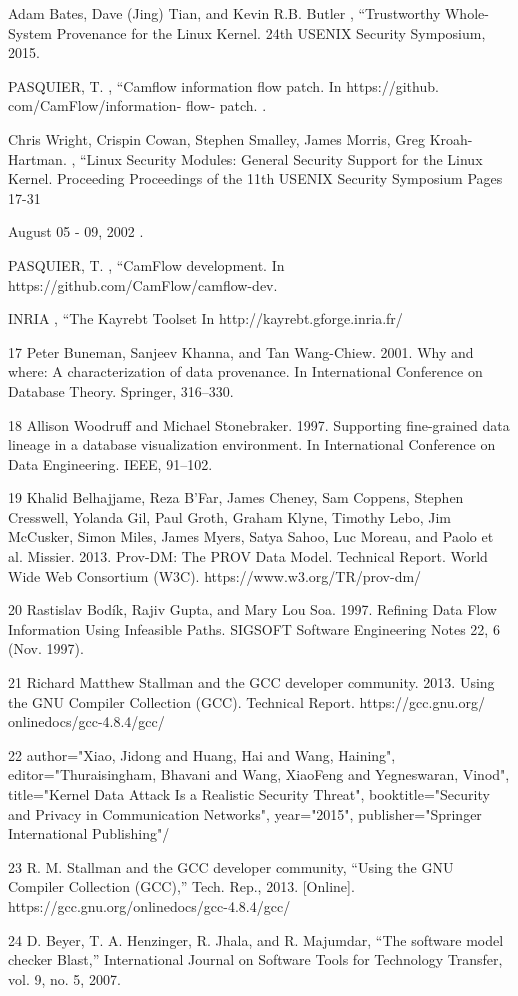 \documentclass{IEEEtran}
\begin{document}
\begin{thebibliography}{00}
 Adam Bates, Dave (Jing) Tian, and Kevin R.B. Butler , ``Trustworthy Whole-System Provenance
for the Linux Kernel.
24th USENIX Security Symposium, 2015.








 PASQUIER, T. , ``Camflow information flow patch.
In https://github. com/CamFlow/information- flow- patch.
.


 	Chris Wright,	
Crispin Cowan,	
Stephen Smalley,	
James Morris,	
Greg Kroah-Hartman.	
, ``Linux Security Modules: General Security Support for the Linux Kernel.
Proceeding
Proceedings of the 11th USENIX Security Symposium
Pages 17-31 

August 05 - 09, 2002 .


 PASQUIER, T. , ``CamFlow development.
In https://github.com/CamFlow/camflow-dev.

 INRIA , ``The Kayrebt Toolset
In http://kayrebt.gforge.inria.fr/


17 Peter Buneman, Sanjeev Khanna, and Tan Wang-Chiew. 2001. Why and where:
A characterization of data provenance. In International Conference on Database
Theory. Springer, 316–330.


18 Allison Woodruff and Michael Stonebraker. 1997. Supporting fine-grained data
lineage in a database visualization environment. In International Conference on
Data Engineering. IEEE, 91–102.

19 Khalid Belhajjame, Reza B’Far, James Cheney, Sam Coppens, Stephen Cresswell,
Yolanda Gil, Paul Groth, Graham Klyne, Timothy Lebo, Jim McCusker, Simon
Miles, James Myers, Satya Sahoo, Luc Moreau, and Paolo et al. Missier. 2013.
Prov-DM: The PROV Data Model. Technical Report. World Wide Web Consortium
(W3C). https://www.w3.org/TR/prov-dm/

20  Rastislav Bodík, Rajiv Gupta, and Mary Lou Soa. 1997. Refining Data Flow
Information Using Infeasible Paths. SIGSOFT Software Engineering Notes 22, 6
(Nov. 1997).

21 Richard Matthew Stallman and the GCC developer community. 2013. Using
the GNU Compiler Collection (GCC). Technical Report. https://gcc.gnu.org/
onlinedocs/gcc-4.8.4/gcc/

22 author="Xiao, Jidong
and Huang, Hai
and Wang, Haining",
editor="Thuraisingham, Bhavani
and Wang, XiaoFeng
and Yegneswaran, Vinod",
title="Kernel Data Attack Is a Realistic Security Threat",
booktitle="Security and Privacy in Communication Networks",
year="2015",
publisher="Springer International Publishing"/

23 R. M. Stallman and the GCC developer community, “Using the
GNU Compiler Collection (GCC),” Tech. Rep., 2013. [Online].
https://gcc.gnu.org/onlinedocs/gcc-4.8.4/gcc/

24 D. Beyer, T. A. Henzinger, R. Jhala, and R. Majumdar, “The software
model checker Blast,” International Journal on Software Tools for
Technology Transfer, vol. 9, no. 5, 2007.

\end{thebibliography}
\end{document}
